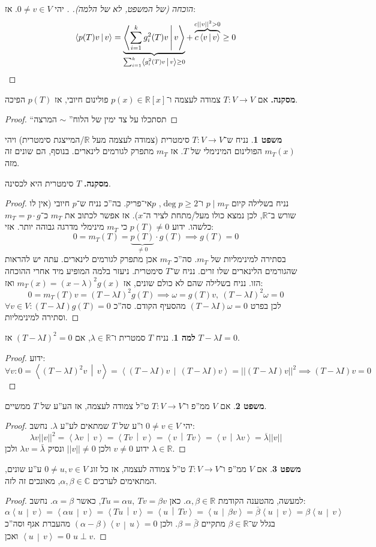 \documentclass[a4paper]{article}
\newcommand\R     {\mathbb{R}}
\newcommand\C     {\mathbb{C}}
\newcommand\ra    {\rangle}
\newcommand\la    {\langle}
\newcommand\ol    {\overline}
\newcommand\co        {\colon}
\newcommand\norm[1]   {\left \vert \left \vert #1 \right \vert \right \vert}
\newcommand\mut [2]   {\left \la #1 \,\middle\vert\, #2 \right \ra}
\newcommand\ag        {\alpha}
\newcommand\bg        {\beta}
\renewcommand\lg      {\lambda}
\theoremstyle{definition}
\newtheorem{Theorem}{משפט}
\newtheorem{Lemma}{למה}
\newcommand\theo  [1] {\begin{Theorem}#1\end{Theorem}}
\newcommand\lem   [1] {\begin{Lemma}#1\end{Lemma}}
\begin{document}
	\begin{proof}[הוכחה (של המשפט, לא של הלמה). ]
		יהי $0 \neq v \in V$. אז: 
		\[ \mut{p(T)v}{v} = \underbrace{\mut{\sum_{i = 1}^{k}g_i^2(T)v}{v}}_{\mathclap{\sum_{i = 1}^{k} \mut{g_i^2(T)v}{v}\ge 0}} + \overbrace{c\mut{v}{v}}^{c\norm{v}^2 > 0} \ge 0 \]
	\end{proof}
	\textbf{מסקנה. }אם $T \co V \to V$ צמודה לעצמה ו־$p(x) \in \R[x]$ פולינום חיובי, אז $p(T)$ הפיכה. 
	\begin{proof}
		``תסתכלו על צד ימין של הלוח'' $\sim$ המרצה
	\end{proof}
	\theo{נניח ש־$T \co V \to V$ סימטרית (צמודה לעצמה מעל $\R$/המייצגת סימטרית) ויהי $m_T(x)$ הפולינום המינימלי של $T$. אז $m_T$ מתפרק לגורמים לינארים. בנוסף, הם שונים זה מזה. }
	\textbf{מסקנה. }$T$ סימטרית היא לכסינה. 
	\begin{proof}
		נניח בשלילה קיום $p \mid m_T$ ו־$\deg p \ge 2$, $p $אי־פריק. בה''כ נניח ש־$p$ חיובי (אין לו שורש ב־$\R$, לכן נמצא כולו מעל/מתחת לציר ה־$x$). אז אפשר לכתוב את $m_T$ כ־$m_T = p \cdot g$ כלשהו. ידוע $p(T) \neq 0$ כי $m_T$ מינימלי מדרגה גבוהה יותר. 
		אזי: 
		\[ 0 = m_T(T) = \underbrace{p(T)}_{\neq 0} \cdot g(T) \implies g(T) = 0 \]
		בסתירה למינימליות של $m_T$. סה''כ $m_T$ אכן מתפרק לגורמים לינארים. עתה יש להראות שהגורמים הלינארים שלו זרים. נניח ש־$T$ סימטרית. ניעזר בלמה המופיע מיד אחרי ההוכחה הזו. נניח בשלילה שהם לא כולם שונים, אז $m_T(x) = (x - \lg)^2g(x)$ ואז: 
		\[ 0 = m_T(T)v = (T - \lg I)^{2}g(T) \implies \omega = g(T)v, \ (T - \lg I)^2\omega = 0 \]
		לכן בפרט $(T - \lg I)\omega = 0$ מהסעיף הקודם. סה''כ $\forall v \in V \co (T - \lg I)g(T) = 0$ וסתירה למינימליות. 
	\end{proof}
	\lem{נניח $T$ סמטרית ו־$\lg \in \R$, אם $(T - \lg I)^{2} = 0$ אז $T - \lg I = 0$. }\begin{proof}
		ידוע: 
		\[ \forall v \co 0 = \mut{(T - \lg I)^{2}v}{v} = \mut{(T - \lg I)v}{(T - \lg I)v} = \norm{(T - \lg I)v}^2 \implies (T - \lg I)v = 0 \]
	\end{proof}
	
	\theo{אם $V$ ממ''פ ו־$T \co V \to V$ ט''ל צמודה לעצמה, אז הע''ע של $T$ ממשיים. }\begin{proof}
		יהי $0 \neq v \in V$ ו''ע של $T$ שמתאים לע''ע $\lg$. נחשב: 
		\[ \lg v\norm{v}^2 = \mut{\lg v}{v} = \mut{T v}{v} = \mut{v}{Tv} = \mut{v}{\lg v} = \ol \lg \norm{v} \]
		ידוע $v \neq 0$ ולכן $\norm{v} \neq 0$ ונסיק $\lg v = \bar \lg $ ולכן $\lg \in \R$. 
	\end{proof}
	
	\theo{אם $V$ ממ''פ ו־$T \co V \to V$ ט''ל צמודה לעצמה, אז כל זוג $0 \neq u, v \in V$ ע''ע שונים, המתאימים לערכים $\ag, \bg \in \C$, מאונכים זה לזה. }\begin{proof}
		למעשה, מהטענה הקודמת $\ag, \bg \in \R$. כאן $Tu = \ag u, \ Tv = \bg v$, כאשר $\ag = \bg$. נחשב: 
		\[ \ag \mut{u}{v} = \mut{\ag u}{v} = \mut{Tu}{v} = \mut{u}{Tv} = \mut{u}{\bg v} = \bar \bg \mut{u}{v} = \bg \mut{u}{v} \]
		בגלל ש־$\bg \in \R$ מתקיים $\bg = \bar \bg$. ולכן $(\ag - \bg)\mut{v}{u} = 0$ מהעברת אגף וסה''כ $\mut{u}{v} = 0$ ואכן $u \perp v$. 
	\end{proof}
	
\end{document}
